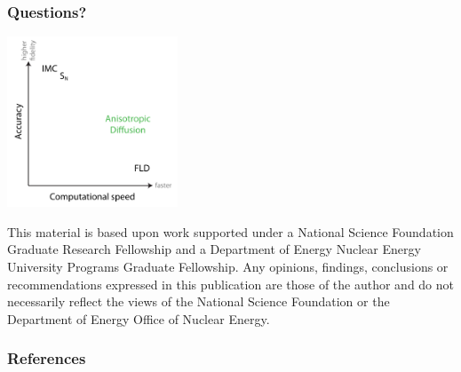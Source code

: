 \documentclass{beamer}
\begin{document}
\begin{frame}
  \frametitle{Questions?}
  \begin{center}
    \includegraphics[width=2in]{../figures/fidelity2}
  \end{center}
{\setlength{\baselineskip}{-\baselineskip} \tiny 
This material is based upon work supported under a National Science Foundation
Graduate Research Fellowship and a Department of Energy Nuclear Energy
University Programs Graduate Fellowship. Any opinions, findings, conclusions or
recommendations expressed in this publication are those of the author and do
not necessarily reflect the views of the National Science Foundation or the
Department of Energy Office of Nuclear Energy.\par}
\end{frame}

\begin{frame}
  \frametitle{References}


\end{frame}

\end{document}
